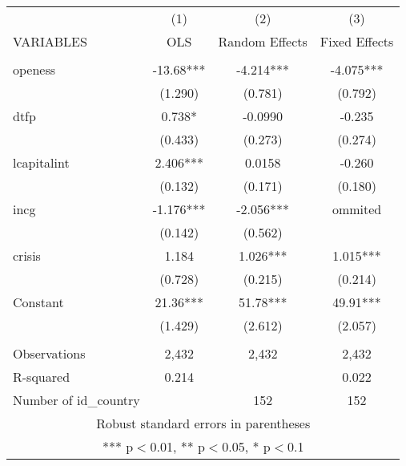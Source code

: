 
\begin{tabular}{lccc} \hline
 & (1) & (2) & (3) \\
VARIABLES & OLS & Random Effects & Fixed Effects \\ \hline
 &  &  &  \\
openess & -13.68*** & -4.214*** & -4.075*** \\
 & (1.290) & (0.781) & (0.792) \\
dtfp & 0.738* & -0.0990 & -0.235 \\
 & (0.433) & (0.273) & (0.274) \\
lcapitalint & 2.406*** & 0.0158 & -0.260 \\
 & (0.132) & (0.171) & (0.180) \\
incg & -1.176*** & -2.056*** & ommited \\
 & (0.142) & (0.562) &  \\
crisis & 1.184 & 1.026*** & 1.015*** \\
 & (0.728) & (0.215) & (0.214) \\
Constant & 21.36*** & 51.78*** & 49.91*** \\
 & (1.429) & (2.612) & (2.057) \\
 &  &  &  \\
Observations & 2,432 & 2,432 & 2,432 \\
R-squared & 0.214 &  & 0.022 \\
 Number of id\_country &  & 152 & 152 \\ \hline
\multicolumn{4}{c}{ Robust standard errors in parentheses} \\
\multicolumn{4}{c}{ *** p$<$0.01, ** p$<$0.05, * p$<$0.1} \\
\end{tabular}

